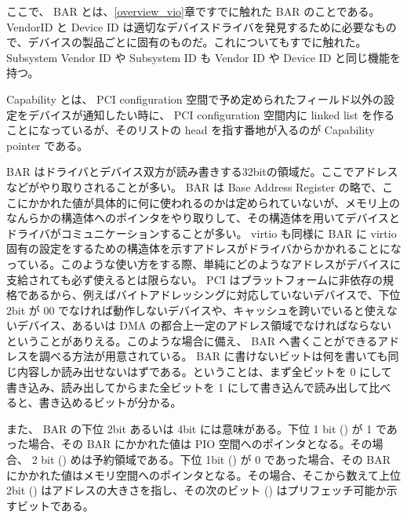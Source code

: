 \documentclass[a4paper,11pt,report]{ltjsbook}
\begin{document}
ここで、 BAR とは、\ref{overview_vio}章ですでに触れた BAR のことである。 VendorID と Device ID は適切なデバイスドライバを発見するために必要なもので、デバイスの製品ごとに固有のものだ。これについてもすでに触れた。Subsystem Vendor ID や Subsystem ID も Vendor ID や Device ID と同じ機能を持つ。

Capability とは、 PCI configuration 空間で予め定められたフィールド以外の設定をデバイスが通知したい時に、 PCI configuration 空間内に linked list を作ることになっているが、そのリストの head を指す番地が入るのが Capability pointer である。

BAR はドライバとデバイス双方が読み書きする32bitの領域だ。ここでアドレスなどがやり取りされることが多い。 BAR は Base Address Register の略で、ここにかかれた値が具体的に何に使われるのかは定められていないが、メモリ上のなんらかの構造体へのポインタをやり取りして、その構造体を用いてデバイスとドライバがコミュニケーションすることが多い。 virtio も同様に BAR に virtio 固有の設定をするための構造体を示すアドレスがドライバからかかれることになっている。このような使い方をする際、単純にどのようなアドレスがデバイスに支給されても必ず使えるとは限らない。 PCI はプラットフォームに非依存の規格であるから、例えばバイトアドレッシングに対応していないデバイスで、下位 2bit が 00 でなければ動作しないデバイスや、キャッシュを跨いでいると使えないデバイス、あるいは DMA の都合上一定のアドレス領域でなければならないということがありえる。このような場合に備え、 BAR へ書くことができるアドレスを調べる方法が用意されている。 BAR に書けないビットは何を書いても同じ内容しか読み出せないはずである。ということは、まず全ビットを 0 にして書き込み、読み出してからまた全ビットを 1 にして書き込んで読み出して比べると、書き込めるビットが分かる。

また、 BAR の下位 2bit あるいは 4bit には意味がある。下位 1 bit
()
が 1 であった場合、その BAR にかかれた値は PIO 空間へのポインタとなる。その場合、 2 bit
()
めは予約領域である。下位 1bit
()
が 0 であった場合、その BAR にかかれた値はメモリ空間へのポインタとなる。その場合、そこから数えて上位 2bit
()
はアドレスの大きさを指し、その次のビット
()
はプリフェッチ可能か示すビットである。
\end{document}
